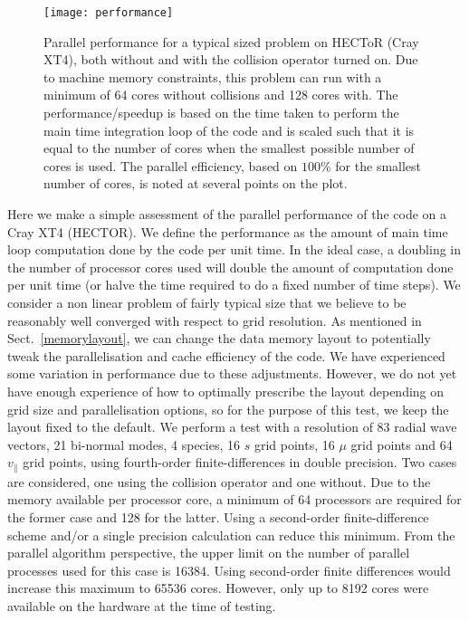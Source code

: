 \begin{figure}[h] 
\begin{center}
\texttt{[image: performance]}
\caption{
  Parallel performance for a typical sized problem on HECToR (Cray XT4), both without and 
  with the collision operator turned on. Due to machine memory constraints, this problem can run with
  a minimum of 64 cores without collisions and 128 cores with. The performance/speedup is based on the
  time taken to perform the main time integration loop of the code and is scaled such that it is equal
  to the number of cores when the smallest possible number of cores is used. The parallel efficiency,
  based on $100$\% for the smallest number of cores, is noted at several points on the plot.
}
\label{scaling}
\end{center}
\end{figure}
Here we make a simple assessment of the parallel performance of the code on a Cray XT4 (HECTOR). We define the performance
as the amount of main time loop computation done by the code per unit time. In the ideal case, a doubling in the
number of processor cores used will double the amount of computation done per unit time (or halve the time required
to do a fixed number of time steps).
We consider a non linear problem of fairly typical size that we believe to be reasonably well converged with respect to grid
resolution. As mentioned in Sect.~\ref{memorylayout}, we can change the data memory layout to potentially
tweak the parallelisation and cache efficiency of the code. We have experienced some variation in performance due to these
adjustments. However, we do not yet have enough experience of how to optimally prescribe the layout depending on grid size and parallelisation options,
so for the purpose of this test, we keep the layout fixed to the default. We perform a test with a resolution of 83 radial wave vectors, 21 bi-normal modes, 4 species, 16 $s$ grid points, 16 $\mu$ grid points and 64 $v_\parallel$ grid
points, using fourth-order finite-differences in double precision. Two cases are considered, one using the collision operator and one
without. Due to the memory available per processor core, a minimum of 64 processors are required for the former case and 128 for the latter. 
Using a second-order finite-difference scheme and/or a single precision calculation can reduce this minimum. From the parallel algorithm
perspective, the upper limit on the number of parallel processes used for this case is 16384. Using second-order finite differences would increase this maximum to 65536 cores.
However, only up to 8192 cores were available on the hardware at the time of testing.

